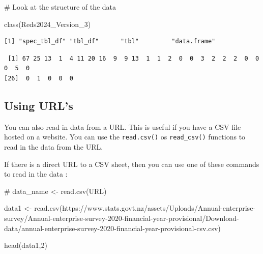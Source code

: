 \documentclass[
  letterpaper,
  DIV=11,
  numbers=noendperiod]{scrreprt}
\newenvironment{Shaded}{\begin{snugshade}}{\end{snugshade}}
\newcommand{\AttributeTok}[1]{\textcolor[rgb]{0.40,0.45,0.13}{#1}}
\newcommand{\CommentTok}[1]{\textcolor[rgb]{0.37,0.37,0.37}{#1}}
\newcommand{\DecValTok}[1]{\textcolor[rgb]{0.68,0.00,0.00}{#1}}
\newcommand{\FunctionTok}[1]{\textcolor[rgb]{0.28,0.35,0.67}{#1}}
\newcommand{\NormalTok}[1]{\textcolor[rgb]{0.00,0.23,0.31}{#1}}
\newcommand{\OtherTok}[1]{\textcolor[rgb]{0.00,0.23,0.31}{#1}}
\newcommand{\SpecialCharTok}[1]{\textcolor[rgb]{0.37,0.37,0.37}{#1}}
\newcommand{\StringTok}[1]{\textcolor[rgb]{0.13,0.47,0.30}{#1}}
\begin{document}
\begin{Shaded}
\begin{Highlighting}[]
\CommentTok{\# Look at the structure of the data}

\FunctionTok{class}\NormalTok{(Reds2024\_Version\_3)}
\end{Highlighting}
\end{Shaded}

\begin{verbatim}
[1] "spec_tbl_df" "tbl_df"      "tbl"         "data.frame" 
\end{verbatim}

\begin{Shaded}
\end{Shaded}

\begin{verbatim}
 [1] 67 25 13  1  4 11 20 16  9  9 13  1  1  2  0  0  3  2  2  2  0  0  0  5  0
[26]  0  1  0  0  0
\end{verbatim}

\subsection*{Using URL's}\label{using-urls}

You can also read in data from a URL. This is useful if you have a CSV
file hosted on a website. You can use the \texttt{read.csv()} os
\texttt{read\_csv()} functions to read in the data from the URL.

If there is a direct URL to a CSV sheet, then you can use one of these
commands to read in the data :

\begin{Shaded}
\begin{Highlighting}[]
\CommentTok{\# data\_name \textless{}{-} read.csv(\textquotesingle{}URL\textquotesingle{})}

\NormalTok{data1 }\OtherTok{\textless{}{-}} \FunctionTok{read.csv}\NormalTok{(}\StringTok{\textquotesingle{}https://www.stats.govt.nz/assets/Uploads/Annual{-}enterprise{-}survey/Annual{-}enterprise{-}survey{-}2020{-}financial{-}year{-}provisional/Download{-}data/annual{-}enterprise{-}survey{-}2020{-}financial{-}year{-}provisional{-}csv.csv\textquotesingle{}}\NormalTok{)}

\FunctionTok{head}\NormalTok{(data1,}\DecValTok{2}\NormalTok{)}
\end{Highlighting}
\end{Shaded}
\end{document}
